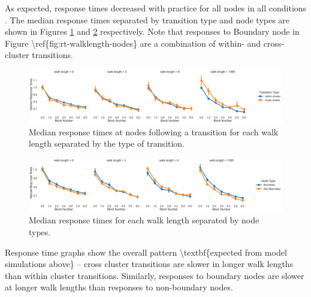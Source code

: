 As expected, response times decreased with practice for all nodes in all conditions . The median response times separated by transition type and node types are shown in Figures \ref{fig:rt-walklength-transitions} and \ref{fig:rt-walklength-nodes} respectively. \ac{Note that responses to Boundary node in Figure \ref{fig:rt-walklength-nodes} are a combination of within- and cross-cluster transitions.}

\begin{figure}
	\centering
	\includegraphics[width = \textwidth]{chapter_notebooks/chapter_2/figures/median_rts_transitiontype.png}
	\caption{Median response times \ac{at nodes following a transition} for each walk length separated by the type of transition.}
	\label{fig:rt-walklength-transitions}
\end{figure}


\begin{figure}
	\centering
	\includegraphics[width = \textwidth]{chapter_notebooks/chapter_2/figures/median_rts_nodetype.png}
	\caption{Median response times for each walk length separated by node types.}
	\label{fig:rt-walklength-nodes}
\end{figure}

Response time graphs show the overall pattern \ac{\textbf{expected from model simulations above}} -- cross cluster transitions are slower in longer walk lengths than within cluster transitions. Similarly, responses to boundary nodes are slower at longer walk lengths than responses to non-boundary nodes. 


